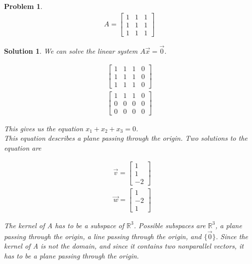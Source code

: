 \documentclass{article}
\newtheorem{problem}{Problem}
\newtheorem*{solution}{Solution}
\begin{document}
\begin{problem}
\begin{align*}
A = \begin{bmatrix}1 & 1 & 1 \\ 1 & 1 & 1 \\ 1 & 1 & 1 \end{bmatrix}
\end{align*}
\end{problem}

\begin{solution}
We can solve the linear system $A\vec{x} = \vec{0}$.

\begin{align*}
\left[ \begin{array}{ccc|c} 1 & 1 & 1 & 0\\ 1 & 1 & 1 & 0\\ 1 & 1 & 1 & 0\end{array} \right] \\
\left[ \begin{array}{ccc|c} 1 & 1 & 1 & 0\\ 0 & 0 & 0 & 0\\ 0 & 0 & 0 & 0\end{array} \right]
\end{align*}

This gives us the equation $x_{1} + x_{2} + x_{3} = 0$. \\

This equation describes a plane passing through the origin. Two solutions to the equation are 

\begin{align*}
& \vec{v} = \begin{bmatrix} 1 \\ 1 \\ -2 \end{bmatrix} \\
& \vec{w} = \begin{bmatrix} 1 \\ -2 \\ 1 \end{bmatrix}
\end{align*}

The kernel of A has to be a subspace of $\mathbb{R}^3$. Possible subspaces are $\mathbb{R}^3$, a plane passing through the origin, a line passing through the origin, and $\{\vec{0}\}$. Since the kernel of A is not the domain, and since it contains two nonparallel vectors, it has to be a plane passing through the origin. \\


\end{solution}
\end{document}
